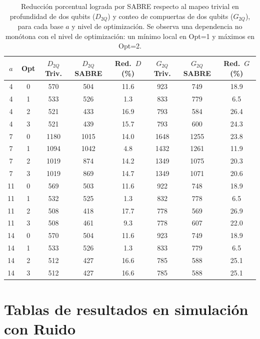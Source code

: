 \documentclass[12pt, spanish]{book}
\begin{document}
\begin{table}[H]
    \centering
    \caption{Reducción porcentual lograda por SABRE respecto al mapeo trivial en
    profundidad de dos qubits ($D_{2Q}$) y conteo de compuertas de dos qubits ($G_{2Q}$),
    para cada base $a$ y nivel de optimización. Se observa una dependencia no monótona
    con el nivel de optimización: un mínimo local en Opt=1 y máximos en Opt=2.}
    \label{tab:reduccion_sabre}
    \begin{tabular}{cccccccc}
        \hline
        $a$ & Opt & $D_{2Q}$ Triv. & $D_{2Q}$ SABRE & Red.\ $D$ (\%) & $G_{2Q}$ Triv. & $G_{2Q}$ SABRE & Red.\ $G$ (\%) \\
        \hline
        4  & 0 & 570  & 504  & 11.6 & 923  & 749  & 18.9 \\
        4  & 1 & 533  & 526  &  1.3 & 833  & 779  &  6.5 \\
        4  & 2 & 521  & 433  & 16.9 & 793  & 584  & 26.4 \\
        4  & 3 & 521  & 439  & 15.7 & 793  & 600  & 24.3 \\
        \hline
        7  & 0 & 1180 & 1015 & 14.0 & 1648 & 1255 & 23.8 \\
        7  & 1 & 1094 & 1042 &  4.8 & 1432 & 1261 & 11.9 \\
        7  & 2 & 1019 &  874 & 14.2 & 1349 & 1075 & 20.3 \\
        7  & 3 & 1019 &  869 & 14.7 & 1349 & 1071 & 20.6 \\
        \hline
        11 & 0 &  569 &  503 & 11.6 &  922 &  748 & 18.9 \\
        11 & 1 &  532 &  525 &  1.3 &  832 &  778 &  6.5 \\
        11 & 2 &  508 &  418 & 17.7 &  778 &  569 & 26.9 \\
        11 & 3 &  508 &  461 &  9.3 &  778 &  607 & 22.0 \\
        \hline
        14 & 0 &  570 &  504 & 11.6 &  923 &  749 & 18.9 \\
        14 & 1 &  533 &  526 &  1.3 &  833 &  779 &  6.5 \\
        14 & 2 &  512 &  427 & 16.6 &  785 &  588 & 25.1 \\
        14 & 3 &  512 &  427 & 16.6 &  785 &  588 & 25.1 \\
        \hline
    \end{tabular}
\end{table}

\section{Tablas de resultados en simulación con Ruido}
\end{document}
